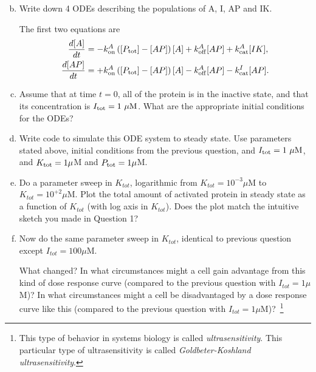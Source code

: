 \documentclass{exam}
\begin{document}
\begin{enumerate}[a.]
\setcounter{enumi}{1}
\item Write down 4 ODEs describing the populations of A, I, AP and IK.  

The first two equations are
\begin{align}
\frac{d{[A]}}{dt} &= -k_{\rm on}^A \left( [P_{\rm tot}] - [AP]\right) [A] + k_{\rm off}^A [AP] + k_{\rm cat}^A [IK],\\
\frac{d{[AP]}}{dt} &= +k_{\rm on}^A \left( [P_{\rm tot}] - [AP]\right) [A] - k_{\rm off}^A [AP] - k_{\rm cat}^I [AP].
\end{align}

\item Assume that at time $t=0$, all of the protein is in the inactive state, and that its concentration is $I_{\rm tot}=1~\mu\mbox{M}$. What are the appropriate initial conditions for the ODEs?

\item Write code to simulate this ODE system to steady state. Use parameters stated above, initial conditions from the previous question, and $I_{\rm tot}=1~\mu\mbox{M}$, and $K_{\rm tot}=1\mu$M and $P_{\rm tot}=1\mu$M.

\item Do a parameter sweep in $K_{tot}$, logarithmic from $K_{tot} = 10^{-3} \mu$M to $K_{tot} = 10^{+2} \mu$M. Plot the total amount of activated protein in steady state as a function of $K_{tot}$ (with log axis in $K_{tot}$). Does the plot match the intuitive sketch you made in Question 1? 



\item Now do the same parameter sweep in $K_{tot}$, identical to previous question except $I_{tot}=100\mu$M. 

What changed? In what circumstances might a cell gain advantage from this kind of dose response curve (compared to the previous question with $I_{tot}=1\mu$M)? In what circumstances might a cell be disadvantaged by a dose response curve like this (compared to the previous question with $I_{tot}=1\mu$M)?~\footnote{This type of behavior in systems biology is called \emph{ultrasensitivity}. This particular type of ultrasensitivity is called \emph{Goldbeter-Koshland ultrasensitivity}.}


\end{enumerate}





  
\end{document}
